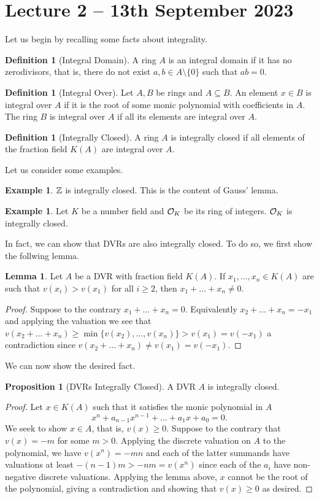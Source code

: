 \documentclass{amsart}
\theoremstyle{definition}
\newtheorem{lemma}[theorem]{Lemma}
\newtheorem{example}[theorem]{Example}
\newtheorem{proposition}[theorem]{Proposition}
\newtheorem{definition}[theorem]{Definition}
\numberwithin{equation}{section}
\begin{document}
\section{Lecture 2 -- 13th September 2023}
Let us begin by recalling some facts about integrality. 
\begin{definition}[Integral Domain]
  A ring $A$ is an integral domain if it has no zerodivisors, that is, there do not exist $a,b\in A\setminus\{0\}$ such that $ab=0$. 
\end{definition}
\begin{definition}[Integral Over]
  Let $A,B$ be rings and $A\subseteq B$. An element $x\in B$ is integral over $A$ if it is the root of some monic polynomial with coefficients in $A$. The ring $B$ is integral over $A$ if all its elements are integral over $A$. 
\end{definition}
\begin{definition}[Integrally Closed]
  A ring $A$ is integrally closed if all elements of the fraction field $K(A)$ are integral over $A$. 
\end{definition}
Let us consider some examples. 
\begin{example}
  $\mathbb{Z}$ is integrally closed. This is the content of Gauss' lemma. 
\end{example}
\begin{example}
  Let $K$ be a number field and $\mathcal{O}_{K}$ be its ring of integers. $\mathcal{O}_{K}$ is integrally closed. 
\end{example}
In fact, we can show that DVRs are also integrally closed. To do so, we first show the follwing lemma. 
\begin{lemma}
  Let $A$ be a DVR with fraction field $K(A)$. If $x_{1},\dots,x_{n}\in K(A)$ are such that $v(x_{i})>v(x_{1})$ for all $i\geq 2$, then $x_{1}+\dots+x_{n}\neq0$. 
\end{lemma}
\begin{proof}
  Suppose to the contrary $x_{1}+\dots+x_{n}=0$. Equivalently $x_{2}+\dots+x_{n}=-x_{1}$ and applying the valuation we see that $v(x_{2}+\dots+x_{n})\geq\min\{v(x_{2}),\dots,v(x_{n})\}>v(x_{1})=v(-x_{1})$ a contradiction since $v(x_{2}+\dots+x_{n})\neq v(x_{1})=v(-x_{1})$. 
\end{proof}
We can now show the desired fact. 
\begin{proposition}[DVRs Integrally Closed]
  A DVR $A$ is integrally closed. 
\end{proposition}
\begin{proof}
Let $x\in K(A)$ such that it satisfies the monic polynomial in $A$
$$x^{n}+a_{n-1}x^{n-1}+\dots+a_{1}x+a_{0}=0.$$
We seek to show $x\in A$, that is, $v(x)\geq0$. Suppose to the contrary that $v(x)=-m$ for some $m>0$. Applying the discrete valuation on $A$ to the polynomial, we have $v(x^{n})=-mn$ and each of the latter summands have valuations at least $-(n-1)m>-nm=v(x^{n})$ since each of the $a_{i}$ have non-negative discrete valuations. Applying the lemma above, $x$ cannot be the root of the polynomial, giving a contradiction and showing that $v(x)\geq0$ as desired. 
\end{proof}
\end{document}
